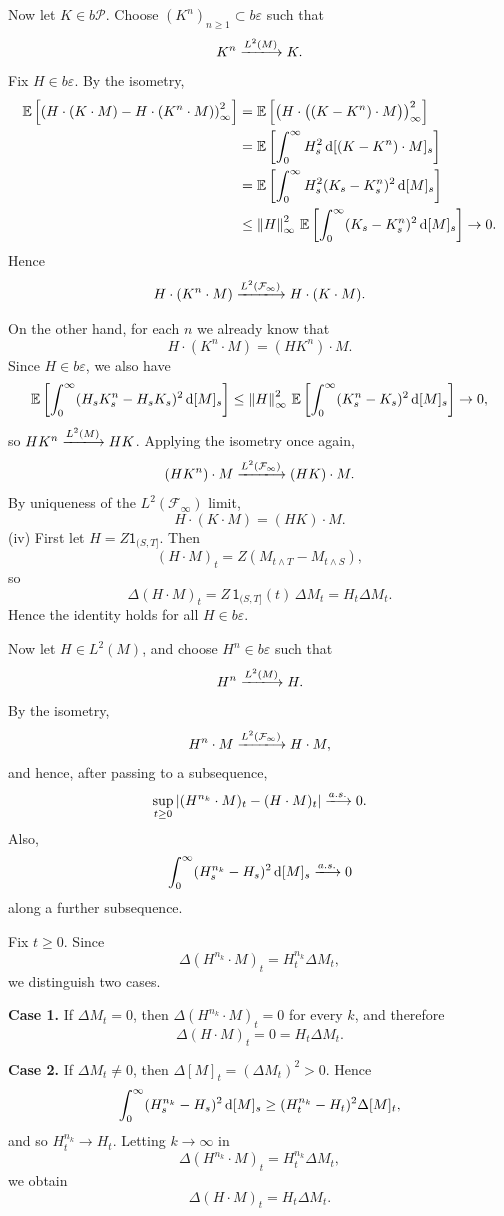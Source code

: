 {    Now let $K \in b\mathcal{P}$. Choose $(K^n)_{n\geq 1} \subset b\varepsilon$ such that
    $$
        K^n \xlongrightarrow{L^2(M)} K.
    $$
    Fix $H \in b\varepsilon$. By the isometry,
    $$
    \begin{aligned}
        \mathbb{E}\left[\left(H \cdot (K\cdot M)-H\cdot(K^n\cdot M)\right)_\infty^2\right]
        &= \mathbb{E}\left[\left(H\cdot\bigl((K-K^n)\cdot M\bigr)\right)_\infty^2\right] \\
        &= \mathbb{E}\left[\int_0^\infty H_s^2 \mathop{}\!\mathrm{d} [ (K-K^n)\cdot M ]_s\right] \\
        &= \mathbb{E}\left[\int_0^\infty H_s^2 (K_s-K_s^n)^2 \mathop{}\!\mathrm{d} [M]_s\right] \\
        &\leq \left\| H \right\|_\infty^2\,\mathbb{E}\left[\int_0^\infty (K_s-K_s^n)^2 \mathop{}\!\mathrm{d} [M]_s\right]
        \to 0.
    \end{aligned}
    $$
    Hence
    $$
        H \cdot (K^n\cdot M) \xlongrightarrow{L^2(\mathcal{F}_\infty)} H \cdot (K\cdot M).
    $$

    On the other hand, for each $n$ we already know that
    $$
        H \cdot (K^n\cdot M) = (HK^n)\cdot M.
    $$
    Since $H \in b\varepsilon$, we also have
    $$
        \mathbb{E}\left[\int_0^\infty (H_sK_s^n-H_sK_s)^2 \mathop{}\!\mathrm{d} [M]_s\right]
        \leq \left\| H \right\|_\infty^2\,\mathbb{E}\left[\int_0^\infty (K_s^n-K_s)^2 \mathop{}\!\mathrm{d} [M]_s\right]
        \to 0,
    $$
    so $HK^n \xlongrightarrow{L^2(M)} HK$. Applying the isometry once again,
    $$
        (HK^n)\cdot M \xlongrightarrow{L^2(\mathcal{F}_\infty)} (HK)\cdot M.
    $$
    By uniqueness of the $L^2(\mathcal{F}_\infty)$ limit,
    $$
        H \cdot (K\cdot M) = (HK)\cdot M.
    $$
    (iv) First let $H = Z\mathsf{1}_{(S,T]}$. Then
    $$
        (H \cdot M)_t = Z(M_{t \wedge T} - M_{t \wedge S}),
    $$
    so
    $$
        \Delta(H \cdot M)_t = Z\,\mathsf{1}_{(S,T]}(t)\,\Delta M_t = H_t \Delta M_t.
    $$
    Hence the identity holds for all $H \in b\varepsilon$.

    Now let $H \in L^2(M)$, and choose $H^n \in b\varepsilon$ such that
    $$
        H^n \xlongrightarrow{L^2(M)} H.
    $$
    By the isometry,
    $$
        H^n \cdot M \xlongrightarrow{L^2(\mathcal{F}_\infty)} H \cdot M,
    $$
    and hence, after passing to a subsequence,
    $$
        \sup_{t \geq 0}\abs{(H^{n_k}\cdot M)_t - (H\cdot M)_t} \xlongrightarrow{a.s.} 0.
    $$
    Also,
    $$
        \int_0^\infty (H^{n_k}_s - H_s)^2 \diff [M]_s \xlongrightarrow{a.s.} 0
    $$
    along a further subsequence.

    Fix $t \geq 0$. Since
    $$
        \Delta(H^{n_k}\cdot M)_t = H^{n_k}_t \Delta M_t,
    $$
    we distinguish two cases.

    \textbf{Case 1.} If $\Delta M_t = 0$, then $\Delta(H^{n_k}\cdot M)_t = 0$ for every $k$, and therefore
    $$
        \Delta(H \cdot M)_t = 0 = H_t \Delta M_t.
    $$

    \textbf{Case 2.} If $\Delta M_t \neq 0$, then $\Delta[M]_t = (\Delta M_t)^2 > 0$. Hence
    $$
        \int_0^\infty (H^{n_k}_s - H_s)^2 \mathop{}\!\mathrm{d} [M]_s
        \geq
        (H^{n_k}_t - H_t)^2 \Delta[M]_t,
    $$
    and so $H^{n_k}_t \to H_t$. Letting $k \to \infty$ in
    $$
        \Delta(H^{n_k}\cdot M)_t = H^{n_k}_t \Delta M_t,
    $$
    we obtain
    $$
        \Delta(H \cdot M)_t = H_t \Delta M_t.
    $$
}
